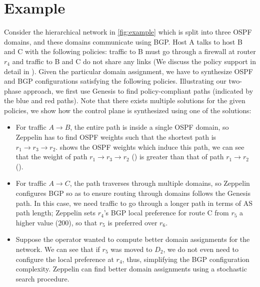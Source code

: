 \section{Example}
Consider the hierarchical network in \cref{fig:example} which
is split into three OSPF domains, and these domains communicate
using BGP. Host A talks to host B and C with the following policies:
traffic to B must go through a firewall at router $r_4$ and traffic 
to B and C do not share any links (We discuss the policy support in
detail in ). Given the particular domain assignment, 
we have to synthesize OSPF and BGP configurations satisfying the 
following policies. Illustrating our two-phase approach, we first 
use Genesis to find policy-compliant paths (indicated by the blue and
red paths). Note that there exists multiple solutions for the given
policies, we show how the control plane is 
synthesized using one of the solutions:

\begin{itemize}
	\item
For traffic $A \rightarrow B$, the entire path is inside
a single OSPF domain, so Zeppelin has to find OSPF weights 
such that the shortest path is $r_1 \rightarrow r_3 \rightarrow 
r_2$.  shows the OSPF weights which induce
this path, we can see that the weight of path $r_1 
\rightarrow r_3 \rightarrow r_2$ () is greater than that of path
$r_1 \rightarrow r_2$ (). 
 	\item For traffic $A \rightarrow C$, the path traverses through 
 	multiple domains, so Zeppelin configures BGP so as to ensure
 	routing through domains follows the Genesis path. In this case, 
 	we need traffic to go through a longer path in terms of AS path
 	length; Zeppelin sets $r_4$'s BGP local preference for route C
 	from $r_5$ a higher value (200), so that $r_5$ is 
 	preferred over $r_6$. 
 	\item Suppose the operator wanted to compute better domain
 	assignments for the network. We can see that if $r_5$ was moved
 	to $D_2$, we do not even need to configure the local preference 
 	at $r_4$, thus, simplifying the BGP configuration complexity. 
 	Zeppelin can find better domain assignments using a stochastic
 	search procedure. 
\end{itemize}